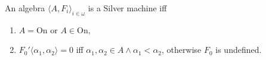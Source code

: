 An algebra $\langle A, F_i \rangle_{i \in \omega}$ is a Silver machine iff
\begin{enumerate}
\item $A = \mathrm{On}$ or $A \in \mathrm{On},$
\item $F_0' \langle \alpha_1, \alpha_2 \rangle = 0$ iff $\alpha_1, \alpha_2 \in A \land \alpha_1 < \alpha_2$, otherwise $F_0$ is undefined.
\end{enumerate}
